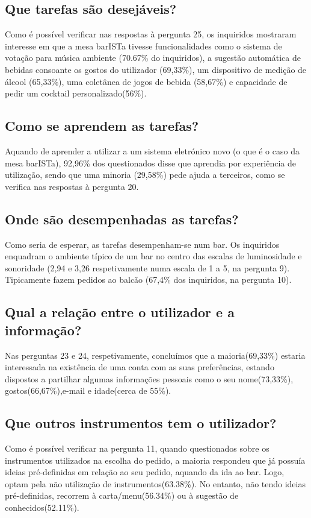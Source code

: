 \documentclass{article}
\begin{document}
\subsection*{Que tarefas são desejáveis?}
Como é possível verificar nas respostas à pergunta 25, os inquiridos mostraram interesse em que a mesa barISTa tivesse funcionalidades como o sistema de votação para música ambiente (70.67\% do inquiridos), a sugestão automática de bebidas consoante os gostos do utilizador (69,33\%), um dispositivo de medição de álcool (65,33\%), uma coletânea de jogos de bebida (58,67\%) e capacidade de pedir um cocktail personalizado(56\%).
\subsection*{Como se aprendem as tarefas?}
Aquando de aprender a utilizar a um sistema eletrónico novo (o que é o caso da mesa barISTa), 92,96\% dos questionados disse que aprendia por experiência de utilização, sendo que uma minoria (29,58\%) pede ajuda a terceiros, como se verifica nas respostas à pergunta 20.
\subsection*{Onde são desempenhadas as tarefas?}
Como seria de esperar, as tarefas desempenham-se num bar. Os inquiridos enquadram o ambiente típico de um bar no centro das escalas de luminosidade e sonoridade (2,94 e 3,26 respetivamente numa escala de 1 a 5, na pergunta 9). Tipicamente fazem pedidos ao balcão (67,4\% dos inquiridos, na pergunta 10).
\subsection*{Qual a relação entre o utilizador e a informação?}
Nas perguntas 23 e 24, respetivamente, concluímos que a maioria(69,33\%) estaria interessada na existência de uma conta com as suas preferências, estando dispostos a partilhar algumas informações pessoais como o seu nome(73,33\%), gostos(66,67\%),e-mail e idade(cerca de 55\%).
\subsection*{Que outros instrumentos tem o utilizador?}
Como é possível verificar na pergunta 11, quando questionados sobre os instrumentos utilizados na escolha do pedido, a maioria respondeu que já possuía ideias pré-definidas em relação ao seu pedido, aquando da ida ao bar. Logo, optam pela não utilização de instrumentos(63.38\%). No entanto, não tendo ideias pré-definidas, recorrem à carta/menu(56.34\%) ou à sugestão de conhecidos(52.11\%).\\
\end{document}
